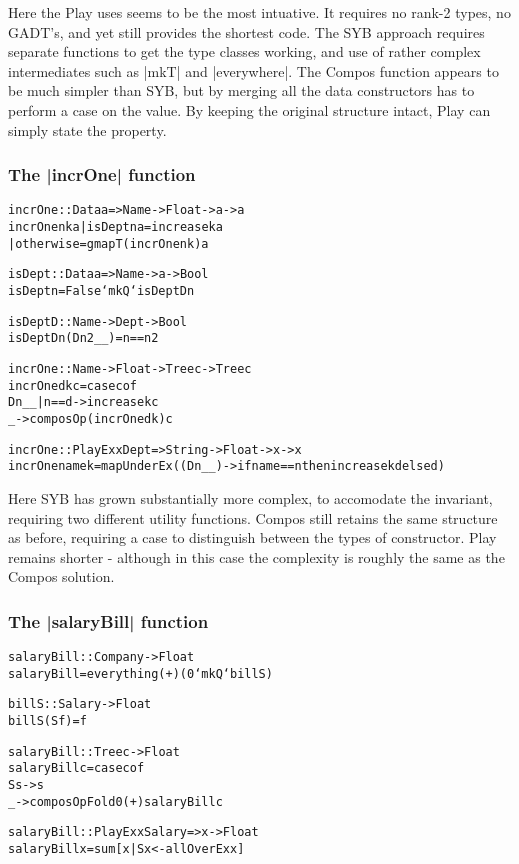 \documentclass[preprint]{sigplanconf}
\newenvironment{code}{\begin{alltt}\small}{\end{alltt}}
\begin{document}
    Here the Play uses seems to be the most intuative. It requires no rank-2 types, no GADT's, and yet still provides the shortest code. The SYB approach requires separate functions to get the type classes working, and use of rather complex intermediates such as |mkT| and |everywhere|. The Compos function appears to be much simpler than SYB, but by merging all the data constructors has to perform a case on the value. By keeping the original structure intact, Play can simply state the property.


\subsubsection{The |incrOne| function}

\begin{code} %
incrOne :: Data a => Name -> Float -> a -> a
incrOne n k a | isDept n a = increase k a
              | otherwise = gmapT (incrOne n k) a

isDept :: Data a => Name -> a -> Bool
isDept n = False `mkQ` isDeptD n

isDeptD :: Name -> Dept -> Bool
isDeptD n (D n2 _ _) = n==n2
\end{code}
\begin{code} %
incrOne :: Name -> Float -> Tree c -> Tree c
incrOne d k c = case c of
    D n _ _ | n == d -> increase k c
    _ -> composOp (incrOne d k) c
\end{code}
\begin{code} %
incrOne :: PlayEx x Dept => String -> Float -> x -> x
incrOne name k = mapUnderEx (\d@(D n _ _) -> if name == n then increase k d else d)
\end{code}

    Here SYB has grown substantially more complex, to accomodate the invariant, requiring two different utility functions. Compos still retains the same structure as before, requiring a case to distinguish between the types of constructor. Play remains shorter - although in this case the complexity is roughly the same as the Compos solution.


\subsubsection{The |salaryBill| function}

\begin{code} %
salaryBill :: Company -> Float
salaryBill = everything (+) (0 `mkQ` billS)

billS :: Salary -> Float
billS (S f) = f
\end{code}
\begin{code} %
salaryBill :: Tree c -> Float
salaryBill c = case c of
    S s -> s
    _ -> composOpFold 0 (+) salaryBill c
\end{code}
\begin{code} %
salaryBill :: PlayEx x Salary => x -> Float
salaryBill x = sum [x | S x <- allOverEx x]
\end{code}
\end{document}
